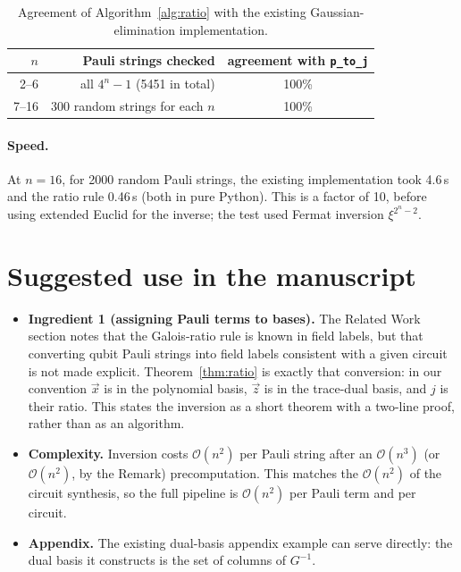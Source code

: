 \documentclass[11pt]{article}
\theoremstyle{definition}
\theoremstyle{remark}
\newcommand{\vx}{\vec{x}}
\newcommand{\vz}{\vec{z}}
\begin{document}
\begin{table}[h]
\centering
\begin{tabular}{rrc}
\toprule
$n$ & Pauli strings checked & agreement with \texttt{p\_to\_j}\\
\midrule
2--6 & all $4^n-1$ (5451 in total) & 100\%\\
7--16 & 300 random strings for each $n$ & 100\%\\
\bottomrule
\end{tabular}
\caption{Agreement of Algorithm~\ref{alg:ratio} with the existing Gaussian-elimination implementation.}
\label{tab:verify}
\end{table}

\paragraph{Speed.}
At $n=16$, for 2000 random Pauli strings, the existing implementation took 4.6\,s and the ratio rule 0.46\,s (both in pure Python).
This is a factor of 10, before using extended Euclid for the inverse; the test used Fermat inversion $\xi^{2^n-2}$.

\section{Suggested use in the manuscript}

\begin{itemize}
  \item \textbf{Ingredient 1 (assigning Pauli terms to bases).}
  The Related Work section notes that the Galois-ratio rule is known in field labels, but that converting qubit Pauli strings into field labels consistent with a given circuit is not made explicit.
  Theorem~\ref{thm:ratio} is exactly that conversion: in our convention $\vx$ is in the polynomial basis, $\vz$ is in the trace-dual basis, and $j$ is their ratio.
  This states the inversion as a short theorem with a two-line proof, rather than as an algorithm.
  \item \textbf{Complexity.} Inversion costs $\mathcal{O}(n^2)$ per Pauli string after an $\mathcal{O}(n^3)$ (or $\mathcal{O}(n^2)$, by the Remark) precomputation.
  This matches the $\mathcal{O}(n^2)$ of the circuit synthesis, so the full pipeline is $\mathcal{O}(n^2)$ per Pauli term and per circuit.
  \item \textbf{Appendix.} The existing dual-basis appendix example can serve directly: the dual basis it constructs is the set of columns of $G^{-1}$.
\end{itemize}



\end{document}
